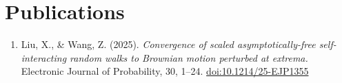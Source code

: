 \documentclass[11pt,letterpaper]{article}
\begin{document}
\section*{Publications}
\begin{enumerate}[leftmargin=*]

\item Liu, X., \& Wang, Z. (2025). \textit{Convergence of scaled asymptotically-free self-interacting random walks to Brownian motion perturbed at extrema.} Electronic Journal of Probability, 30, 1–24. \href{https://doi.org/10.1214/25-EJP1355}{doi:10.1214/25-EJP1355}

\end{enumerate}
\end{document}
